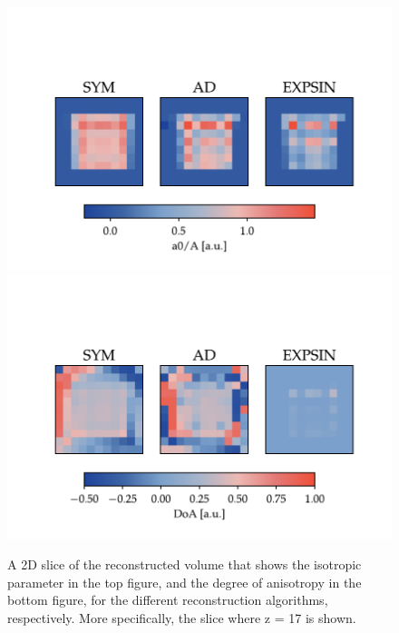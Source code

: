 \begin{figure}[h!]
    \centering
    \includegraphics[trim={0 0cm 0 2.5cm},clip,width=1\textwidth]{./svg-inkscape/P_slices_A_svg-tex.pdf}
    \includegraphics[trim={0 0cm 0 2.5cm},clip,width=1\textwidth]{./svg-inkscape/P_slices_DoA_svg-tex.pdf}
    \caption[Slice of Reconstructed Coefficients for Phantom Data Set]{ A 2D slice of the reconstructed volume that shows the isotropic parameter in the top figure, and the degree of anisotropy in the bottom figure, for the different reconstruction algorithms, respectively.
        More specifically, the slice where z = 17 is shown.}
    \label{fig:phantom_reconstruction_2D}
\end{figure}

